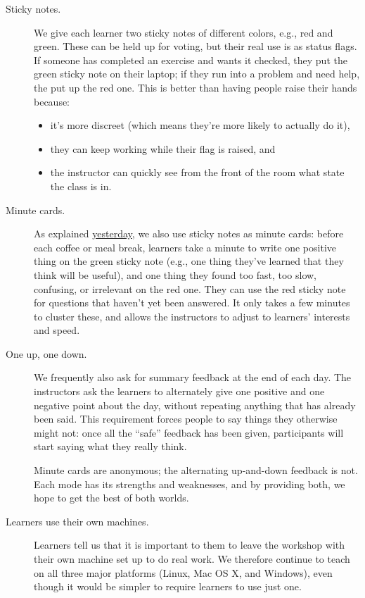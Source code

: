 \begin{description}
\item[Sticky notes.]
We give each learner two sticky notes of different colors, e.g., red and
green. These can be held up for voting, but their real use is as status
flags. If someone has completed an exercise and wants it checked, they
put the green sticky note on their laptop; if they run into a problem
and need help, the put up the red one. This is better than having people
raise their hands because:

\begin{itemize}
\itemsep1pt\parskip0pt
\item
  it's more discreet (which means they're more likely to actually do
  it),
\item
  they can keep working while their flag is raised, and
\item
  the instructor can quickly see from the front of the room what state
  the class is in.
\end{itemize}
\item[Minute cards.]
As explained \href{\{\{\%20page.root\%20\}\}/06-summarize/}{yesterday},
we also use sticky notes as minute cards: before each coffee or meal
break, learners take a minute to write one positive thing on the green
sticky note (e.g., one thing they've learned that they think will be
useful), and one thing they found too fast, too slow, confusing, or
irrelevant on the red one. They can use the red sticky note for
questions that haven't yet been answered. It only takes a few minutes to
cluster these, and allows the instructors to adjust to learners'
interests and speed.
\item[One up, one down.]
We frequently also ask for summary feedback at the end of each day. The
instructors ask the learners to alternately give one positive and one
negative point about the day, without repeating anything that has
already been said. This requirement forces people to say things they
otherwise might not: once all the ``safe'' feedback has been given,
participants will start saying what they really think.

Minute cards are anonymous; the alternating up-and-down feedback is not.
Each mode has its strengths and weaknesses, and by providing both, we
hope to get the best of both worlds.
\item[Learners use their own machines.]
Learners tell us that it is important to them to leave the workshop with
their own machine set up to do real work. We therefore continue to teach
on all three major platforms (Linux, Mac OS X, and Windows), even though
it would be simpler to require learners to use just one.


\end{description}
